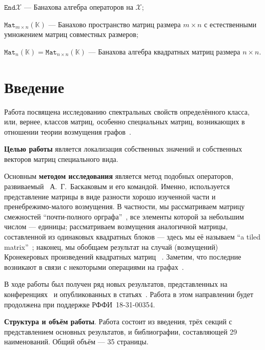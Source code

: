 \documentclass[14pt,a4paper]{extarticle}
\numberwithin{equation}{section}
\theoremstyle{definition}
\begin{document}
\( \mathtt{End}\mathscr{X} \) --- Банахова алгебра операторов на
\( \mathscr{X} \);

\( \mathtt{Mat}_{m{\times}n}(\mathbb{K}) \) --- Банахово пространство матриц
размера \( m\times n \) с естественными умножением матриц
совместных размеров;

\( \mathtt{Mat}_{n}(\mathbb{K}) = \mathtt{Mat}_{n{\times}n}(\mathbb{K}) \) ---
Банахова алгебра квадратных матриц размера \( n{\times}n \).


\newpage

\section{Введение}
Работа посвящена исследованию спектральных свойств определённого класса, или,
вернее, классов матриц,
особенно специальных матриц, возникающих в отношении теории возмущения
графов~\cite{cvetkovic1997eigenspaces}.

\textbf{Целью работы}
является локализация собственных значений и собственных векторов
матриц специального вида.

Основным \textbf{методом исследования} является ме\-тод подобных опер\-атор\-ов,
развиваемый~\cite{baskakov1986theorem,baskakov1987theorem,baskakov1994spectral,baskakov2002splitting}
А.~Г.~Баскаковым и его командой. Именно, используется представление матрицы
в виде разности хорошо изученной части и пренебрежимо-малого возмущения.
В частности, мы рас\-сматр\-иваем матрицу смежностей
``почти-полного орграфа''~\cite{Koz17,sergekozlukov@vspu},
все элементы которой за небольшим числом --- единицы;
рассматриваем возмущения аналогичной матрицы, составленной из одинаковых
квадрат\-ных блоков --- здесь мы её называем ``a tiled
matrix''~\cite{Koz18,sergekozlukov@currentproblems};
наконец, мы обобщ\-аем результат на случай (возмущений) Кронекер\-овых
произведений квадратных матриц
~\cite{Koz18,sergekozlukov@currentproblems,bellman-matrices-kron,XIANG2005210}.
Заметим, что последние возникают в связи с некоторыми операциями на графах~\cite{cvetkovic1997eigenspaces}.

В ходе работы был получен ряд новых результатов, представленных на
конференциях~\cite{sergekozlukov@vspu,sergekozlukov@currentproblems} и
опубликованных в статьях~\cite{Koz17,Koz18}. Работа в этом направлении будет
продолжена при поддержке РФФИ~18-31-00354.

\textbf{Структура и объём работы}. Работа состоит из введения, трёх секций с
представлением основных результатов, и би\-блио\-графии, со\-став\-ляющей 29
на\-имено\-ва\-ний. Общий объём --- 35 страницы.
\end{document}

